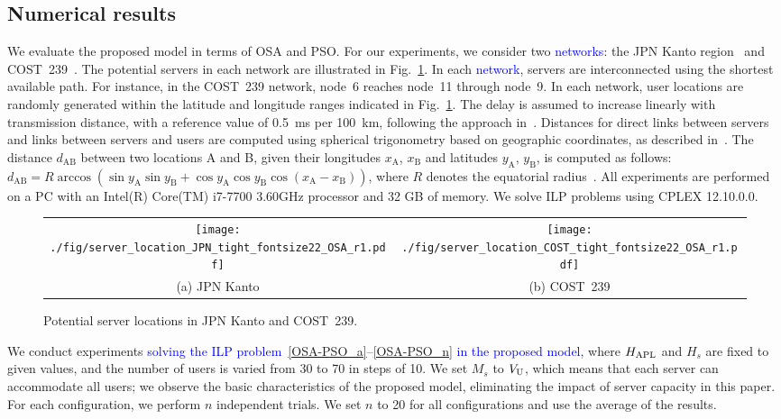 \documentclass[10pt, letterpaper]{IEEEtran}
\newcommand\blue[1]{\textcolor{blue}{#1}}
\begin{document}
\begin{CJK}{UTF8}{ipxm}
\section{Numerical results}
\label{sec:numerical_results}
We evaluate the proposed model in terms of OSA and PSO.
% 
For our experiments, we consider two \blue{networks}: the JPN Kanto region~\cite{JPN} and COST~239~\cite{COST}. 
The potential servers in each network are illustrated in Fig.~\ref{fig:ServerLocation}.
In each \blue{network}, servers are interconnected using the shortest available path.
For instance, in the COST~239 network, node~6 reaches node~11 through node~9.
In each network, user locations are randomly generated within the latitude and longitude ranges indicated in Fig.~\ref{fig:ServerLocation}.
The delay is assumed to increase linearly with transmission distance, with a reference value of 0.5~ms per 100~km, following the approach in~\cite{KawabataICC2023}.
Distances for direct links between servers and links between servers and users are computed using spherical trigonometry based on geographic coordinates, as described in~\cite{12Imanaka2024}.
The distance $d_\mathrm{AB}$ between two locations A and B, given their longitudes $x_\mathrm{A}$, $x_\mathrm{B}$ and latitudes $y_\mathrm{A}$, $y_\mathrm{B}$, is computed as follows:
$d_\mathrm{AB} = R \arccos\left( \sin y_\mathrm{A} \sin y_\mathrm{B} + \cos y_\mathrm{A} \cos y_\mathrm{B} \cos(x_\mathrm{A} - x_\mathrm{B}) \right)$,
where $R$ denotes the equatorial radius\blue{~\cite{Zohora2018}}.
All experiments are performed on a PC with an Intel(R) Core(TM) i7-7700 3.60GHz processor and 32 GB of memory.
We solve ILP problems using CPLEX 12.10.0.0\cite{CPLEX}.
\begin{figure}[t]
  \begin{center}
      \begin{tabular}{cc}
      \texttt{[image: ./fig/server\_location\_JPN\_tight\_fontsize22\_OSA\_r1.pdf]} &
      \texttt{[image: ./fig/server\_location\_COST\_tight\_fontsize22\_OSA\_r1.pdf]} \\
      (a) JPN Kanto & (b) COST~239
      \end{tabular}
  \end{center}
  \caption{Potential server locations in JPN Kanto and COST~239.}
  \label{fig:ServerLocation}
\end{figure}

We conduct experiments \blue{solving the ILP problem~\eqref{OSA-PSO_a}--\eqref{OSA-PSO_n} in the proposed model}, where $H_{\rm APL}$ and $H_s$ are fixed to given values, and the number of users is varied from 30 to 70 in steps of 10.
We set $M_s$ to $V_{\rm U}$, which means that each server can accommodate all users; we observe the basic characteristics of the proposed model, eliminating the impact of server capacity in this paper.
For each configuration, we perform $n$ independent trials.
We set $n$ to 20 for all configurations
and use the average of the results.


\end{CJK}
\end{document}
